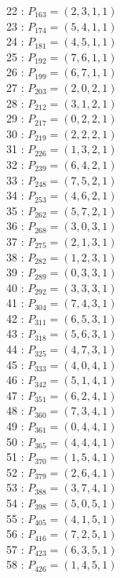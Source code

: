 \documentclass{article}
\begin{document}
{\begin{multicols}{3}
22 : $P_{163}=( 2, 3, 1, 1 )$\\
23 : $P_{174}=( 5, 4, 1, 1 )$\\
24 : $P_{181}=( 4, 5, 1, 1 )$\\
25 : $P_{192}=( 7, 6, 1, 1 )$\\
26 : $P_{199}=( 6, 7, 1, 1 )$\\
27 : $P_{203}=( 2, 0, 2, 1 )$\\
28 : $P_{212}=( 3, 1, 2, 1 )$\\
29 : $P_{217}=( 0, 2, 2, 1 )$\\
30 : $P_{219}=( 2, 2, 2, 1 )$\\
31 : $P_{226}=( 1, 3, 2, 1 )$\\
32 : $P_{239}=( 6, 4, 2, 1 )$\\
33 : $P_{248}=( 7, 5, 2, 1 )$\\
34 : $P_{253}=( 4, 6, 2, 1 )$\\
35 : $P_{262}=( 5, 7, 2, 1 )$\\
36 : $P_{268}=( 3, 0, 3, 1 )$\\
37 : $P_{275}=( 2, 1, 3, 1 )$\\
38 : $P_{282}=( 1, 2, 3, 1 )$\\
39 : $P_{289}=( 0, 3, 3, 1 )$\\
40 : $P_{292}=( 3, 3, 3, 1 )$\\
41 : $P_{304}=( 7, 4, 3, 1 )$\\
42 : $P_{311}=( 6, 5, 3, 1 )$\\
43 : $P_{318}=( 5, 6, 3, 1 )$\\
44 : $P_{325}=( 4, 7, 3, 1 )$\\
45 : $P_{333}=( 4, 0, 4, 1 )$\\
46 : $P_{342}=( 5, 1, 4, 1 )$\\
47 : $P_{351}=( 6, 2, 4, 1 )$\\
48 : $P_{360}=( 7, 3, 4, 1 )$\\
49 : $P_{361}=( 0, 4, 4, 1 )$\\
50 : $P_{365}=( 4, 4, 4, 1 )$\\
51 : $P_{370}=( 1, 5, 4, 1 )$\\
52 : $P_{379}=( 2, 6, 4, 1 )$\\
53 : $P_{388}=( 3, 7, 4, 1 )$\\
54 : $P_{398}=( 5, 0, 5, 1 )$\\
55 : $P_{405}=( 4, 1, 5, 1 )$\\
56 : $P_{416}=( 7, 2, 5, 1 )$\\
57 : $P_{423}=( 6, 3, 5, 1 )$\\
58 : $P_{426}=( 1, 4, 5, 1 )$\\

\end{multicols}}
\end{document}
